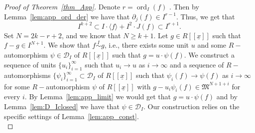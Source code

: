 \documentclass{article}
\DeclareMathOperator{\ord}{ord}
\newcommand{\equivd}{\overset{I}{\sim}}
\numberwithin{theorem}{section}
\begin{document}
\begin{proof}[Proof of Theorem~\ref{thm_App}]
    Denote $r=\ord_I(f)$ . Then by Lemma~\ref{lem:app_ord_der} we have that $\partial_j(f) \in I^{r-1}$. Thus, we get that 
    \begin{equation*}
        I^{k+2} \subset I \cdot \langle f \rangle + I^2 \cdot J(f) \subset I^{r+1}. 
    \end{equation*}
    Set $N=2k-r+2$, and we know that $N \geq k+1$. Let $g \in R[[\underline{x}]]$ such that $f-g \in I^{N+1}$. We show that $f \equivd g$, i.e., there exists some unit $u$ and some $R-$automorphism $\psi \in \mathcal{D}_I$ of $R[[\underline{x}]]$ such that $g=u\cdot \psi(f)$. We construct a sequence of units $\{u_i\}_{i=1}^\infty$ such that $u_i \to u$ as $i \to \infty$ and a sequence of $R-$automorphisms $\{\psi_i\}_{i=1}^\infty \subset \mathcal{D}_I$ of $R[[\underline{x}]]$ such that $\psi_i(f) \to \psi(f)$ as $i \to \infty$ for some $R-$automorphism $\psi$ of $R[[\underline{x}]]$ with $g - u_i \psi_i(f) \in \mathfrak{M}^{N+1+i}$ for every $i$. By  Lemma~\ref{lem:app_limit} we would get that $g = u \cdot \psi(f)$ and by Lemma~\ref{lem:D_Iclosed} we have that $\psi \in \mathcal{D}_I$. Our construction relies on the specific settings of Lemma~\ref{lem:app_const}.\\
    

\end{proof}
\end{document}
